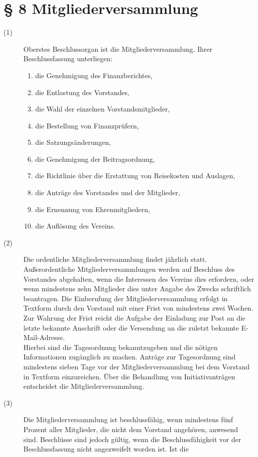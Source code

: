 \documentclass[12pt,paper=a4,ngerman]{scrreprt}
\begin{document}
\section{\S{} 8 Mitgliederversammlung}
\begin{description}
\item[(1)]
Oberstes Beschlussorgan ist die Mitgliederversammlung. Ihrer
Beschlussfassung unterliegen:
\begin{enumerate}
\item die Genehmigung des Finanzberichtes,
\item die Entlastung des Vorstandes,
\item die Wahl der einzelnen Vorstandsmitglieder,
\item die Bestellung von Finanzprüfern,
\item die Satzungsänderungen,
\item die Genehmigung der Beitragsordnung,
\item die Richtlinie über die Erstattung von Reisekosten und Auslagen,
\item die Anträge des Vorstandes und der Mitglieder,
\item die Ernennung von Ehrenmitgliedern,
\item die Auflösung des Vereins.
\end{enumerate}
\item[(2)]
Die ordentliche Mitgliederversammlung findet jährlich statt.
Außerordentliche Mitgliederversammlungen werden auf Beschluss des
Vorstandes abgehalten, wenn die Interessen des Vereins dies erfordern,
oder wenn mindestens zehn Mitglieder dies unter Angabe des Zwecks
schriftlich beantragen. Die Einberufung der Mitgliederversammlung
erfolgt in Textform durch den Vorstand mit einer Frist von mindestens
zwei Wochen. Zur Wahrung der Frist reicht die Aufgabe der Einladung
zur Post an die letzte bekannte Anschrift oder die Versendung an die
zuletzt bekannte E-Mail-Adresse.\\
Hierbei sind die Tagesordnung bekanntzugeben und die nötigen
Informationen zugänglich zu machen. Anträge zur Tagesordnung sind
mindestens sieben Tage vor der Mitgliederversammlung bei dem Vorstand
in Textform einzureichen. Über die Behandlung von Initiativanträgen
entscheidet die Mitgliederversammlung.
\item[(3)]
Die Mitgliederversammlung ist beschlussfähig, wenn mindestens fünf
Prozent aller Mitglieder, die nicht dem Vorstand angehören, anwesend
sind. Beschlüsse sind jedoch gültig, wenn die Beschlussfähigkeit vor
der Beschlussfassung nicht angezweifelt worden ist. Ist die

\end{description}
\end{document}
